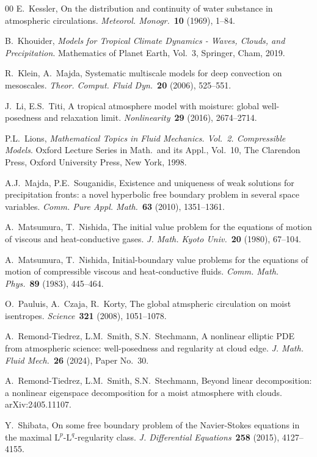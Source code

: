 \documentclass[10pt]{amsart}
\theoremstyle{plain}
\theoremstyle{definition}
\theoremstyle{thm}
\numberwithin{equation}{section}
\newcommand{\rL}{\mathrm{L}}
\begin{document}
\begin{thebibliography}{00}
E.~Kessler, 
On the distribution and continuity of water substance in atmospheric circulations.
{\it Meteorol. Monogr.}~{\bf 10} (1969), 1--84.

B.~Khouider,
{\it Models for Tropical Climate Dynamics - Waves, Clouds, and Precipitation}. Mathematics of Planet Earth, Vol.~3, Springer, Cham, 2019.

R.~Klein, A.~Majda, 
Systematic multiscale models for deep convection on mesoscales.
{\it Theor. Comput. Fluid Dyn.}~{\bf 20} (2006), 525--551.

J.~Li, E.S.~Titi,
A tropical atmosphere model with moisture: global well-posedness and relaxation limit.
{\it Nonlinearity}~{\bf 29} (2016), 2674--2714.

P.L.~Lions,
{\it Mathematical Topics in Fluid Mechanics. Vol.~2. Compressible Models}. Oxford Lecture Series in Math.~and its Appl., Vol.~10, The Clarendon Press, Oxford University Press, New York, 1998.

A.J.~Majda, P.E.~Souganidis, 
Existence and uniqueness of weak solutions for precipitation fronts: a novel hyperbolic free boundary problem in several space variables.
{\it Comm. Pure Appl. Math.}~{\bf 63} (2010), 1351--1361.

A.~Matsumura, T.~Nishida, 
The initial value problem for the equations of motion of viscous and heat-conductive gases.
{\it J. Math. Kyoto Univ.}~{\bf 20} (1980), 67--104.

A.~Matsumura, T.~Nishida, 
Initial-boundary value problems for the equations of motion of compressible viscous and heat-conductive fluids.
{\it Comm. Math. Phys.}~{\bf 89} (1983), 445--464.

O.~Pauluis, A.~Czaja, R.~Korty,
The global atmspheric circulation on moist isentropes.
{\it Science}~{\bf 321} (2008), 1051--1078.

A.~Remond-Tiedrez, L.M.~Smith, S.N.~Stechmann, 
A nonlinear elliptic PDE from atmospheric science: well-posedness and regularity at cloud edge.
{\it J. Math. Fluid Mech.}~{\bf 26} (2024), Paper No.~30.

A.~Remond-Tiedrez, L.M.~Smith, S.N.~Stechmann,
Beyond linear decomposition: a nonlinear eigenspace decomposition for a moist atmosphere with clouds.
arXiv:2405.11107.

Y.~Shibata, 
On some free boundary problem of the Navier-Stokes equations in the maximal $\rL^p$-$\rL^q$-regularity class.
{\it J. Differential Equations}~{\bf 258} (2015), 4127--4155.


\end{thebibliography}
\end{document}
